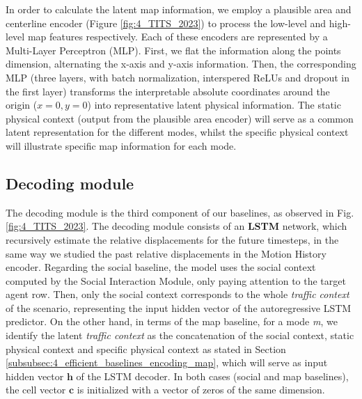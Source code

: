 In order to calculate the latent map information, we employ a plausible area and centerline encoder (Figure \ref{fig:4_TITS_2023}) to process the low-level and high-level map features respectively. Each of these encoders are represented by a Multi-Layer Perceptron (MLP). First, we flat the information along the points dimension, alternating the x-axis and y-axis information. Then, the corresponding MLP (three layers, with batch normalization, interspered ReLUs and dropout in the first layer) transforms the interpretable absolute coordinates around the origin ($x=0, y=0$) into representative latent physical information. The static physical context (output from the plausible area encoder) will serve as a common latent representation for the different modes, whilst the specific physical context will illustrate specific map information for each mode.

\subsection{Decoding module}
\label{subsubsec:4_efficient_baselines_decoding_modules}

The decoding module is the third component of our baselines, as observed in Fig. \ref{fig:4_TITS_2023}. The decoding module consists of an \textbf{LSTM} network, which recursively estimate the relative displacements for the future timesteps, in the same way we studied the past relative displacements in the Motion History encoder. Regarding the social baseline, the model uses the social context computed by the Social Interaction Module, only paying attention to the target agent row. Then, only the social context corresponds to the whole \textit{traffic context} of the scenario, representing the input hidden vector of the autoregressive LSTM predictor. On the other hand, in terms of the map baseline, for a mode \textit{m}, we identify the latent \textit{traffic context} as the concatenation of the social context, static physical context and specific physical context as stated in Section \ref{subsubsec:4_efficient_baselines_encoding_map}, which will serve as input hidden vector $\mathbf{h}$ of the LSTM decoder. In both cases (social and map baselines), the cell vector $\mathbf{c}$ is initialized with a vector of zeros of the same dimension. \\

